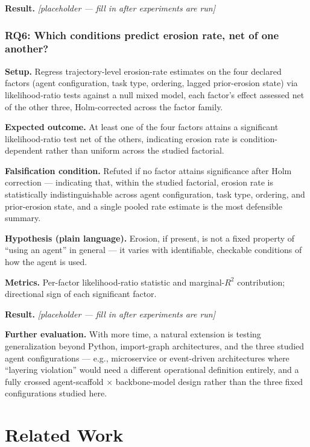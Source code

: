\documentclass[11pt]{article}
\newcommand{\ph}{\textit{[placeholder --- fill in after experiments are run]}}
\begin{document}
\textbf{Result.} \ph

\subsubsection{RQ6: Which conditions predict erosion rate, net of one another?}
\textbf{Setup.} Regress trajectory-level erosion-rate estimates on the four declared factors (agent configuration, task type, ordering, lagged prior-erosion state) via likelihood-ratio tests against a null mixed model, each factor's effect assessed net of the other three, Holm-corrected across the factor family.

\textbf{Expected outcome.} At least one of the four factors attains a significant likelihood-ratio test net of the others, indicating erosion rate is condition-dependent rather than uniform across the studied factorial.

\textbf{Falsification condition.} Refuted if no factor attains significance after Holm correction --- indicating that, within the studied factorial, erosion rate is statistically indistinguishable across agent configuration, task type, ordering, and prior-erosion state, and a single pooled rate estimate is the most defensible summary.

\textbf{Hypothesis (plain language).} Erosion, if present, is not a fixed property of ``using an agent'' in general --- it varies with identifiable, checkable conditions of how the agent is used.

\textbf{Metrics.} Per-factor likelihood-ratio statistic and marginal-$R^2$ contribution; directional sign of each significant factor.

\textbf{Result.} \ph

\vspace{0.5em}
\noindent\textbf{Further evaluation.} With more time, a natural extension is testing generalization beyond Python, import-graph architectures, and the three studied agent configurations --- e.g., microservice or event-driven architectures where ``layering violation'' would need a different operational definition entirely, and a fully crossed agent-scaffold $\times$ backbone-model design rather than the three fixed configurations studied here.

\section{Related Work}
\end{document}

